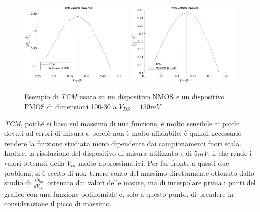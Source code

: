 \documentclass[12pt, letterpaper]{book}
\begin{document}
\begin{figure}[h!]
  \centering
  \includegraphics[width=0.49\textwidth]{TCM-N4-100-30-NoFit}
  \includegraphics[width=0.49\textwidth]{TCM-P1-100-30-NoFit}
  \caption{Esempio di \emph{TCM} usato su un dispositivo NMOS e un dispositivo PMOS di dimensioni 100-30 a $V_{DS} = 150 mV$}
\end{figure}

\emph{TCM}, poiché si basa sul massimo di una funzione, è molto sensibile ai picchi dovuti ad errori di misura e perciò non è molto affidabile: è quindi necessario rendere la funzione studiata meno dipendente dai campionamenti fuori scala. Inoltre, la risoluzione del dispositivo di misura utilizzato e di $5 mV$, il che rende i valori ottenuti della $V_{th}$ molto approssimativi.
Per far fronte a questi due problemi, si è scelto di non tenere conto del massimo direttamente ottenuto dallo studio di $\frac{dg_m}{dV_{GS}}$ ottenuto dai valori delle misure, ma di interpolare prima i punti del grafico con una funzione polinomiale e, solo a questo punto, di prendere in considerazione il picco di massimo. \\
\end{document}
